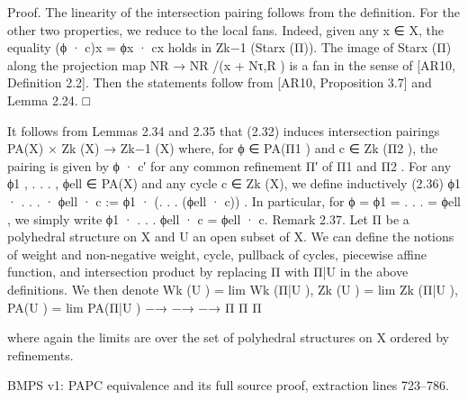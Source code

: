 \documentclass[
  11pt,
]{article}
\newenvironment{Shaded}{}{}
\newcommand{\NormalTok}[1]{#1}
\begin{document}
\begin{Shaded}
\begin{Highlighting}[]
\NormalTok{Proof. The linearity of the intersection pairing follows from the definition. For the other two}
\NormalTok{properties, we reduce to the local fans. Indeed, given any x ∈ X, the equality (ϕ · c)x = ϕx · cx}
\NormalTok{holds in Zk−1 (Starx (Π)). The image of Starx (Π) along the projection map NR → NR /(x + Nτ,R ) is}
\NormalTok{a fan in the sense of [AR10, Definition 2.2]. Then the statements follow from [AR10, Proposition}
\NormalTok{3.7] and Lemma 2.24.                                                                            □}

\NormalTok{   It follows from Lemmas 2.34 and 2.35 that (2.32) induces intersection pairings}
\NormalTok{                                               PA(X) × Zk (X) → Zk−1 (X)}
\NormalTok{where, for ϕ ∈ PA(Π1 ) and c ∈ Zk (Π2 ), the pairing is given by ϕ · c′ for any common refinement Π′}
\NormalTok{of Π1 and Π2 . For any ϕ1 , . . . , ϕell ∈ PA(X) and any cycle c ∈ Zk (X), we define inductively}
\NormalTok{(2.36)                                      ϕ1 · . . . · ϕell · c := ϕ1 · (. . . (ϕell · c)) .}
\NormalTok{In particular, for ϕ = ϕ1 = . . . = ϕell , we simply write ϕ1 · . . . ϕell · c = ϕell · c.}
\NormalTok{Remark 2.37. Let Π be a polyhedral structure on X and U an open subset of X. We can define}
\NormalTok{the notions of weight and non{-}negative weight, cycle, pullback of cycles, piecewise affine function,}
\NormalTok{and intersection product by replacing Π with Π|U in the above definitions. We then denote}
\NormalTok{               Wk (U ) = lim Wk (Π|U ),             Zk (U ) = lim Zk (Π|U ),           PA(U ) = lim PA(Π|U )}
\NormalTok{                         −→                                   −→                                −→}
\NormalTok{                               Π                                  Π                               Π}

\NormalTok{where again the limits are over the set of polyhedral structures on X ordered by refinements.}
\end{Highlighting}
\end{Shaded}

BMPS v1: PAPC equivalence and its full source proof, extraction lines
723--786.
\end{document}

